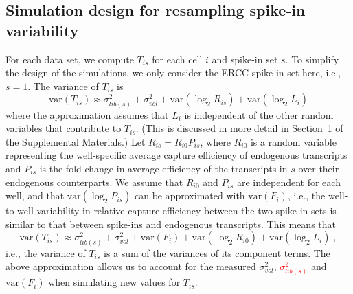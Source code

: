 \documentclass{article}
\newcommand{\suppsecmath}{1}
\newcommand{\revised}[1]{\textcolor{red}{#1}}
\newcommand\variance{\mbox{var}}
\begin{document}
\subsection*{Simulation design for resampling spike-in variability}
For each data set, we compute $T_{is}$ for each cell $i$ and spike-in set $s$.
To simplify the design of the simulations, we only consider the ERCC spike-in set here, i.e., $s=1$.
The variance of $T_{is}$ is
\[
    \variance(T_{is}) \approx \sigma^2_{lib(s)} + \sigma^2_{vol} + \variance(\log_2 R_{is}) + \variance(\log_2 L_i)
\]
where the approximation assumes that $L_i$ is independent of the other random variables that contribute to $T_{is}$.
(This is discussed in more detail in Section~\suppsecmath{} of the Supplemental Materials.)
Let $R_{is} = R_{i0}P_{is}$, where $R_{i0}$ is a random variable representing the well-specific average capture efficiency of endogenous transcripts and $P_{is}$ is the fold change in average efficiency of the transcripts in $s$ over their endogenous counterparts.
We assume that $R_{i0}$ and $P_{is}$ are independent for each well, and that $\variance(\log_2 P_{is})$ can be approximated with $\variance(F_i)$,
i.e., the well-to-well variability in relative capture efficiency between the two spike-in sets is similar to that between spike-ins and endogenous transcripts.
This means that
\[
    \variance(T_{is}) \approx \sigma^2_{lib(s)} + \sigma^2_{vol} + \variance(F_i) + \variance(\log_2 R_{i0}) + \variance(\log_2 L_i) \;,
\]
i.e., the variance of $T_{is}$ is a sum of the variances of its component terms.
The above approximation allows us to account for the measured $\sigma^2_{vol}$, \revised{$\sigma^2_{lib(s)}$} and $\variance(F_i)$ when simulating new values for $T_{is}$.

\end{document}
